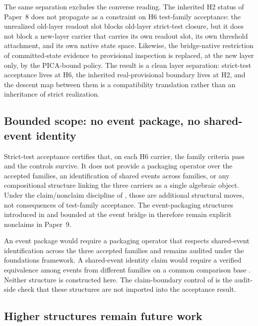 \documentclass[11pt]{article}
\newcommand{\OldLayer}{H2}
\newcommand{\NewLayer}{H6}
\newcommand{\PaperNine}{Paper~9}
\newcommand{\PaperEight}{Paper~8}
\theoremstyle{definition}
\begin{document}
The same separation excludes the converse reading.  The inherited \OldLayer{}
status of \PaperEight{} does not propagate as a constraint on \NewLayer{}
test-family acceptance: the unrealized old-layer readout slot blocks old-layer
strict-test closure, but it does not block a new-layer carrier that carries its
own readout slot, its own threshold attachment, and its own native state space.
Likewise, the bridge-native restriction of committed-state evidence to
provisional inspection is replaced, at the new layer only, by the PICA-bound
policy.  The result is a clean layer separation: strict-test acceptance lives at
\NewLayer{}, the inherited real-provisional boundary lives at \OldLayer{}, and
the descent map between them is a compatibility translation rather than an
inheritance of strict realization.

\subsection{Bounded scope: no event package, no shared-event identity}\label{subsec:tests-do-not-imply-event-package}

Strict-test acceptance certifies that, on each \NewLayer{} carrier, the family
criteria pass and the controls survive.  It does not provide a packaging
operator over the accepted families, an identification of shared events across
families, or any compositional structure linking the three carriers as a single
algebraic object.  Under the claim/nonclaim discipline of
\cite{Tsiokos2026FoundationsII}, those are additional structural moves, not
consequences of test-family acceptance.  The event-packaging structures
introduced in \cite{Tsiokos2026LocallyBoolean} and bounded at the event bridge
in \cite{Tsiokos2026CarrierToEvent} therefore remain explicit nonclaims in
\PaperNine{}.

An event package would require a packaging operator that respects
shared-event identification across the three accepted families and remains
audited under the foundations framework.  A shared-event identity claim would
require a verified equivalence among events from different families on a common
comparison base \cite{Tsiokos2026LocallyBoolean}.  Neither structure is
constructed here.  The claim-boundary control of
 is the audit-side check that
these structures are not imported into the acceptance result.

\subsection{Higher structures remain future work}\label{subsec:higher-structures-blocked}
\end{document}
